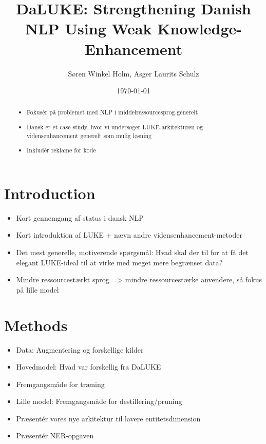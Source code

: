 \documentclass[12pt, fleqn]{article}
\title{DaLUKE: Strengthening Danish NLP Using Weak Knowledge-Enhancement}
\author{Søren Winkel Holm, Asger Laurits Schulz}
\date{\today}
\begin{document}
\setlength{\headheight}{15pt}
\addtolength{\topmargin}{-2.5pt}
\maketitle

\begin{abstract}
    \begin{itemize}
        \item Fokusér på problemet med NLP i middelressourcesprog generelt
        \item Dansk er et case study, hvor vi undersøger LUKE-arkitekturen og vidensenhancement generelt som mulig løsning
        \item Inkludér reklame for kode
    \end{itemize}
\end{abstract}
\section{Introduction}%
\label{sec:Introduction}
\begin{itemize}
    \item Kort gennemgang af status i dansk NLP
    \item Kort introduktion af LUKE + nævn andre vidensenhancement-metoder
    \item Det mest generelle, motiverende spørgsmål: Hvad skal der til for at få det elegant LUKE-ideal til at virke med meget mere begrænset data?
    \item Mindre ressourcestærkt sprog => mindre ressourcestærke anvendere, så fokus på lille model
\end{itemize}

\section{Methods}%
\label{sec:Methods}

\begin{itemize}
    \item Data: Augmentering og forskellige kilder
    \item Hovedmodel: Hvad var forskellig fra DaLUKE
    \item Fremgangsmåde for træning
    \item Lille model: Fremgangsmåde for destillering/pruning
    \item Præsentér vores nye arkitektur til lavere entitetsdimension
    \item Præsentér NER-opgaven
\end{itemize}
\end{document}
